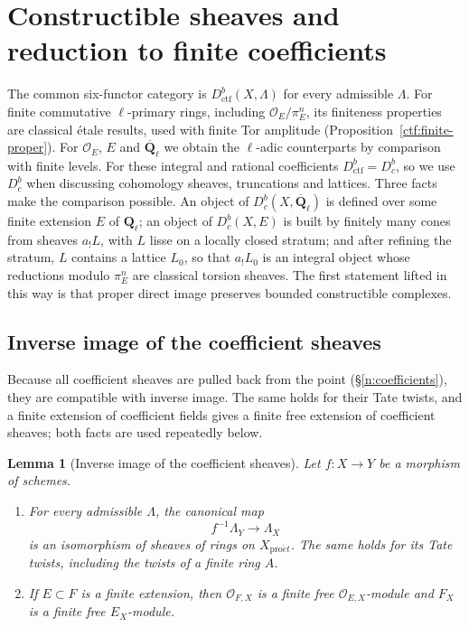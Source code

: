\documentclass[11pt,a4paper]{article}
\numberwithin{equation}{section}
\newtheorem{lemma}[theorem]{Lemma}
\theoremstyle{definition}
\theoremstyle{remark}
\newcommand{\Dbc}{D^b_c}
\newcommand{\Qbar}{\overline{\mathbf Q}_\ell}
\newcommand{\Ql}{\mathbf Q_\ell}
\newcommand{\proet}{\mathrm{pro}\acute{e}t}
\newcommand{\Dctf}{D^b_{\mathrm{ctf}}}
\begin{document}
\section{Constructible sheaves and reduction to finite coefficients}
\label{b:sec:coefficients}

The common six-functor category is $\Dctf(X,\Lambda)$ for every
admissible $\Lambda$. For finite commutative $\ell$-primary rings,
including $\mathcal O_E/\pi_E^n$, its finiteness properties are
classical \'etale results, used with finite Tor amplitude
(Proposition~\ref{ctf:finite-proper}). For $\mathcal O_E$, $E$ and
$\Qbar$ we obtain the $\ell$-adic counterparts by comparison with finite
levels. For these integral and rational coefficients $\Dctf=\Dbc$, so
we use $\Dbc$ when discussing cohomology sheaves, truncations and
lattices. Three facts make the comparison possible. An object of
$\Dbc(X,\Qbar)$ is defined over some finite extension $E$ of $\Ql$; an
object of $\Dbc(X,E)$ is built by finitely many cones from sheaves
$a_!L$, with $L$ lisse on a locally closed stratum; and after refining
the stratum, $L$ contains a lattice $L_0$, so that $a_!L_0$ is an
integral object whose reductions modulo $\pi_E^n$ are classical torsion
sheaves. The first statement lifted in this way is that proper direct
image preserves bounded constructible complexes.

\subsection{Inverse image of the coefficient sheaves}

Because all coefficient sheaves are pulled back from the point
(\S\ref{n:coefficients}), they are compatible with inverse image. The
same holds for their Tate twists, and a finite extension of coefficient
fields gives a finite free extension of coefficient sheaves; both facts
are used repeatedly below.

\begin{lemma}[Inverse image of the coefficient sheaves]
\label{b:lem:coefficient-pullback}
Let $f:X\to Y$ be a morphism of schemes.
\begin{enumerate}
\item For every admissible $\Lambda$, the canonical map
  \[
   f^{-1}\Lambda_Y\longrightarrow\Lambda_X
  \]
  is an isomorphism of sheaves of rings on $X_{\proet}$. The same holds for its Tate
  twists, including the twists of a finite ring $A$.
\item If $E\subset F$ is a finite extension, then $\mathcal O_{F,X}$ is a
  finite free $\mathcal O_{E,X}$-module and $F_X$ is a finite free
  $E_X$-module.
\end{enumerate}
\end{lemma}
\end{document}
